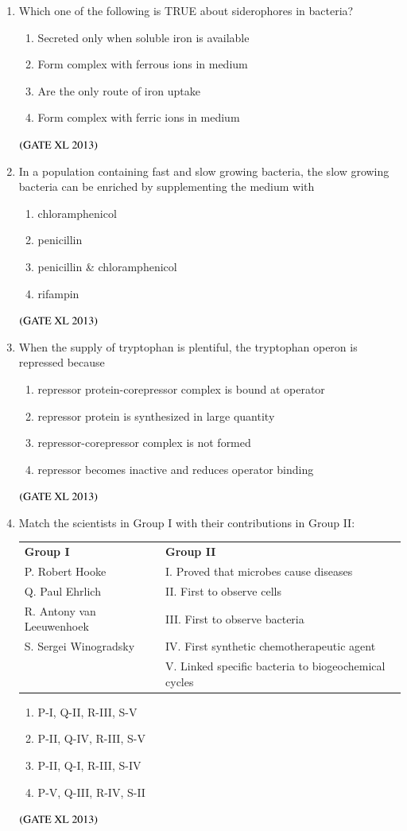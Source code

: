 \documentclass[journal]{IEEEtran}
\begin{document}
\begin{enumerate}
\begin{enumerate}[label=\arabic*., start=11]
\item Which one of the following is TRUE about siderophores in bacteria?
\begin{enumerate}
\item Secreted only when soluble iron is available
\item Form complex with ferrous ions in medium
\item Are the only route of iron uptake
\item Form complex with ferric ions in medium
\end{enumerate}
\hfill $\left(\text{GATE XL 2013}\right)$

\item In a population containing fast and slow growing bacteria, the slow growing bacteria can be enriched by supplementing the medium with
\begin{enumerate}
\item chloramphenicol
\item penicillin
\item penicillin \& chloramphenicol
\item rifampin
\end{enumerate}
\hfill $\left(\text{GATE XL 2013}\right)$

\item When the supply of tryptophan is plentiful, the tryptophan operon is repressed because
\begin{enumerate}
\item repressor protein-corepressor complex is bound at operator
\item repressor protein is synthesized in large quantity
\item repressor-corepressor complex is not formed
\item repressor becomes inactive and reduces operator binding
\end{enumerate}
\hfill $\left(\text{GATE XL 2013}\right)$

\item Match the scientists in Group I with their contributions in Group II:  
\begin{tabular}{ll}
\textbf{Group I} & \textbf{Group II} \\
P. Robert Hooke & I. Proved that microbes cause diseases \\
Q. Paul Ehrlich & II. First to observe cells \\
R. Antony van Leeuwenhoek & III. First to observe bacteria \\
S. Sergei Winogradsky & IV. First synthetic chemotherapeutic agent \\
& V. Linked specific bacteria to biogeochemical cycles \\
\end{tabular}
\begin{enumerate}
\item P-I, Q-II, R-III, S-V
\item P-II, Q-IV, R-III, S-V
\item P-II, Q-I, R-III, S-IV
\item P-V, Q-III, R-IV, S-II
\end{enumerate}
\hfill $\left(\text{GATE XL 2013}\right)$


\end{enumerate}
\end{enumerate}
\end{document}
